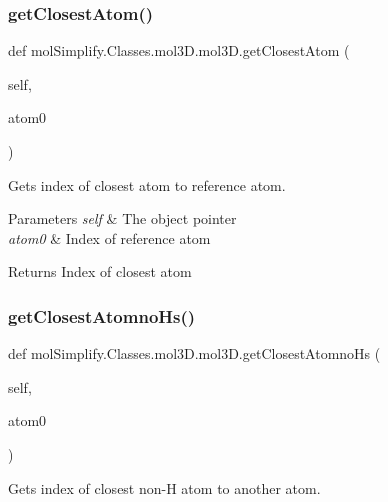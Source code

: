 \subsubsection{\texorpdfstring{get\+Closest\+Atom()}{getClosestAtom()}}
{\footnotesize\ttfamily def mol\+Simplify.\+Classes.\+mol3\+D.\+mol3\+D.\+get\+Closest\+Atom (\begin{DoxyParamCaption}\item[{}]{self,  }\item[{}]{atom0 }\end{DoxyParamCaption})}



Gets index of closest atom to reference atom. 


\begin{DoxyParams}{Parameters}
{\em self} & The object pointer \\
\hline
{\em atom0} & Index of reference atom \\
\hline
\end{DoxyParams}
\begin{DoxyReturn}{Returns}
Index of closest atom 
\end{DoxyReturn}
\mbox{\label{classmolSimplify_1_1Classes_1_1mol3D_1_1mol3D_a3f137b174fb3b427893ed88d685888ce}} 
\subsubsection{\texorpdfstring{get\+Closest\+Atomno\+Hs()}{getClosestAtomnoHs()}}
{\footnotesize\ttfamily def mol\+Simplify.\+Classes.\+mol3\+D.\+mol3\+D.\+get\+Closest\+Atomno\+Hs (\begin{DoxyParamCaption}\item[{}]{self,  }\item[{}]{atom0 }\end{DoxyParamCaption})}



Gets index of closest non-\/H atom to another atom. 


